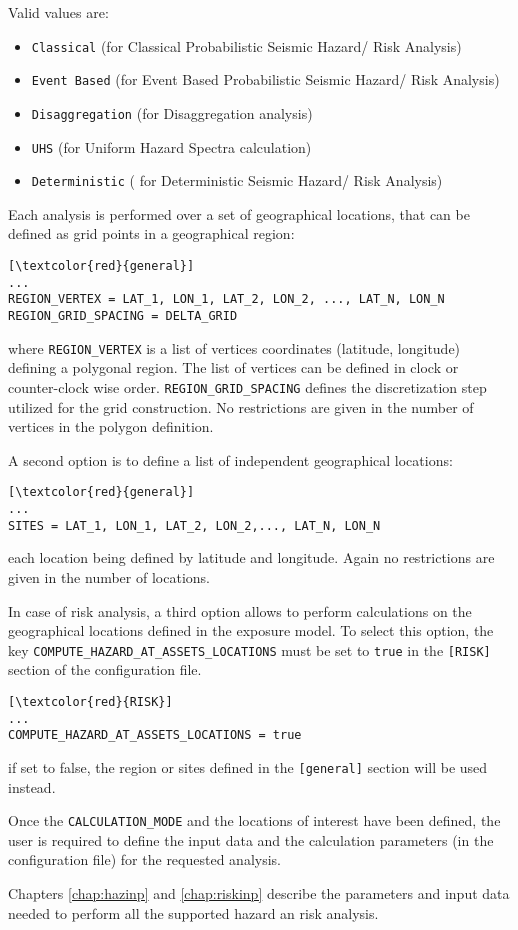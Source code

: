 Valid values are: 
\begin{itemize}
\item \Verb+Classical+ (for Classical Probabilistic Seismic Hazard/ Risk Analysis)
\item \Verb+Event Based+ (for Event Based Probabilistic Seismic Hazard/ Risk Analysis)
\item \Verb+Disaggregation+ (for Disaggregation analysis)
\item \Verb+UHS+ (for Uniform Hazard Spectra calculation)
\item \Verb+Deterministic+ ( for Deterministic Seismic Hazard/ Risk Analysis)
\end{itemize}

Each analysis is performed over a set of geographical locations, that can be defined as grid points in a geographical region:

\begin{Verbatim}[frame=single, commandchars=\\\{\}, samepage=true]
[\textcolor{red}{general}]
...
REGION_VERTEX = LAT_1, LON_1, LAT_2, LON_2, ..., LAT_N, LON_N
REGION_GRID_SPACING = DELTA_GRID
\end{Verbatim}

where \Verb+REGION_VERTEX+ is a list of vertices coordinates (latitude, longitude) defining a polygonal region. The list of vertices can be defined in clock or counter-clock wise order. \Verb+REGION_GRID_SPACING+ defines the discretization step utilized for the grid construction. No restrictions are given in the number of vertices in the polygon definition.

A second option is to define a list of independent geographical locations:
\begin{Verbatim}[frame=single, commandchars=\\\{\}, samepage=true]
[\textcolor{red}{general}]
...
SITES = LAT_1, LON_1, LAT_2, LON_2,..., LAT_N, LON_N
\end{Verbatim}
each location being defined by latitude and longitude. Again no restrictions are given in the number of locations.

In case of risk analysis, a third option allows to perform calculations on the geographical locations defined in the exposure model. To select this option, the key \Verb+COMPUTE_HAZARD_AT_ASSETS_LOCATIONS+ must be set to \Verb+true+ in the \Verb+[RISK]+ section of the configuration file.
\begin{Verbatim}[frame=single, commandchars=\\\{\}, samepage=true]
[\textcolor{red}{RISK}]
...
COMPUTE_HAZARD_AT_ASSETS_LOCATIONS = true
\end{Verbatim}
if set to false, the region or sites defined in the \Verb+[general]+ section will be used instead.

Once the \Verb+CALCULATION_MODE+ and the locations of interest have been defined, the user is required to define the input data and the calculation parameters (in the configuration file) for the requested analysis.

Chapters \ref{chap:hazinp} and \ref{chap:riskinp} describe the parameters and input data needed to perform all the supported hazard an risk analysis.